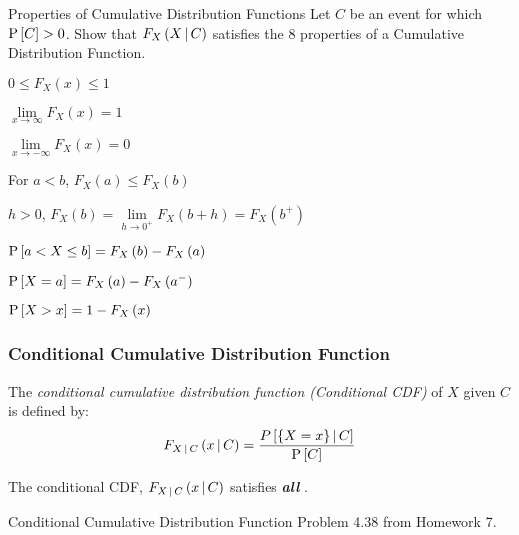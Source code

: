 			\begin{example}[Problem 4.29]{Properties of Cumulative Distribution Functions}
				Let $C$ be an event for which $\operatorname{\operatorname{P}} \left[ C \right] > 0$. Show that $F_{X} \left( X \operatorname{\vert} C \right)$ satisfies the 8 properties of a Cumulative Distribution Function.
				\begin{propertylist}
					\item $0 \leq F_{X} \left( x \right) \leq 1$
					\item $\lim \limits_{x \rightarrow \infty} F_{X} \left( x \right) = 1$
					\item $\lim \limits_{x \rightarrow -\infty} F_{X} \left( x \right) = 0$
					\item For $a < b$, $F_{X} \left( a \right) \leq F_{X} \left( b \right)$
					\item $h>0$, $F_{X} \left( b \right) = \lim\limits_{h \rightarrow 0^{+}} F_{X} \left( b+h \right) = F_{X} \left( b^{+} \right)$
					\item $\operatorname{\operatorname{P}} \left[ a < X \leq b \right] = F_{X} \left( b \right) - F_{X} \left( a \right)$
					\item $\operatorname{\operatorname{P}} \left[ X = a \right] = F_{X} \left( a \right) - F_{X} \left( a^{-} \right)$
					\item $\operatorname{\operatorname{P}} \left[ X > x \right] = 1 - F_{X} \left( x \right)$
				\end{propertylist}
			\end{example}
		
		\subsubsection{Conditional Cumulative Distribution Function} \label{subsubsec:Conditional Cumulative Distribution Fuction}
			\begin{definition}  \label{def:Conditional Cumulative Distribution Function}
				The \emph{conditional cumulative distribution function (Conditional CDF)} of $X$ given $C$ is defined by:
				\begin{equation} \label{eq:Conditional Cumulative Distribution Function}
					F_{X \operatorname{\vert} C} \left( x \operatorname{\vert} C \right) = \frac{P \left[ \lbrace X = x \rbrace \operatorname{\vert} C \right]}{\operatorname{\operatorname{P}} \left[ C \right]}
				\end{equation}
				\begin{remark}
					The conditional CDF, $F_{X \operatorname{\vert} C} \left( x \operatorname{\vert} C \right)$ satisfies \emph{\textbf{all}} .
				\end{remark}
			\end{definition}
			\begin{example}[Problem 4.38]{Conditional Cumulative Distribution Function}
				Problem 4.38 from Homework 7.
			\end{example}
		
